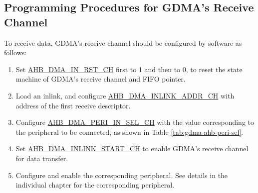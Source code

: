 \documentclass[main\_\_EN.tex]{subfiles}
\begin{document}
\subsection{Programming Procedures for GDMA's Receive Channel}
To receive data, GDMA's receive channel should be configured by software as follows:
\begin{enumerate}
    \item Set \hyperref[fielddesc:AHBDMAINRSTCHN]{AHB\_DMA\_IN\_RST\_CH} first to 1 and then to 0, to reset the state machine of GDMA's receive channel and FIFO pointer.
    \item Load an inlink, and configure \hyperref[fielddesc:AHBDMAINLINKADDRCHN]{AHB\_DMA\_INLINK\_ADDR\_CH} with address of the first receive descriptor.
    \item Configure \hyperref[fielddesc:AHBDMAPERIINSELCHN]{AHB\_DMA\_PERI\_IN\_SEL\_CH} with the value corresponding to the peripheral to be connected, as shown in Table \ref{tab:gdma-ahb-peri-sel}.
    \item Set \hyperref[fielddesc:AHBDMAINLINKSTARTCHN]{AHB\_DMA\_INLINK\_START\_CH} to enable GDMA's receive channel for data transfer.
    \item Configure and enable the corresponding peripheral. See details in the individual chapter for the corresponding peripheral.
\end{enumerate}
\end{document}
